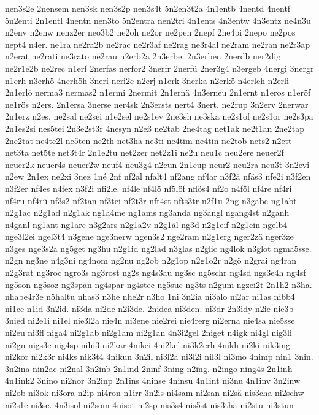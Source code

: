 {nen3s2e
2nensem
nen3sk
nen3s2p
nen3s4t
5n2en3t2a
4n1entb
4nentd
4nentf
5n2enti
2n1entl
4nentn
nen3to
5n2entra
nen2tri
4n1ents
4n3entw
4n3entz
ne4n3u
n2env
n2enw
nenz2er
neo3b2
ne2oh
ne2or
ne2pen
2nepf
2ne4pi
2nepo
ne2pos
nept4
n4er.
ne1ra
ne2ra2b
ne2rac
ne2r3af
ne2rag
ne3r4al
ne2ram
ne2ran
ne2r3ap
n2erat
ne2rati
ne3rato
ne2rau
n2erb2a
2n3erbe.
2n3erben
2nerdb
ner2dig
ne2r1e2b
ne2rec
n1erf
2nerfas
nerfor2
3nerfr
2nerfü
2ner3g4
n3ergeb
4nergi
3nergr
n1erh
n3erhö
4nerhöh
3neri
neri2e
n2erj
n1erk
3nerka
n2erkö
n4erleh
n2erli
2n1erlö
nerma3
nermas2
n1ermi
2nermit
2n1ernä
4n3erneu
2n1ernt
n1eros
n1eröf
ne1rös
n2ers.
2n1ersa
3nerse
ner4sk
2n3ersts
nert4
3nert.
ne2rup
3n2erv
2nerwar
2n1erz
n2es.
ne2sal
ne2sei
n1e2sel
ne2s1ev
2ne3sh
ne3ska
ne2s1of
ne2s1or
ne2s3pa
2n1es2si
nes5tei
2n3e2st3r
4nesyn
n2eß
ne2tab
2ne4tag
net1ak
ne2t1an
2ne2tap
2ne2tat
ne4te2l
ne5ten
ne2th
net3ha
ne3ti
ne4tim
ne4tin
ne2tob
nets2
n2ett
net3ta
net5te
net3t4r
2n1e2tu
net2zer
net2z1i
ne2u
neu1c
neu2ere
neuer2f
neuer2k
neuer4s
neuer2w
neuf4
neu3g4
n2eun
2n1eup
neur2
neu2ra
neu3t
3n2evi
n2ew
2n1ex
ne2xi
3nez
1né
2nf
nf2al
nfalt4
nf2ang
nf4ar
n3f2ä
nfäs3
nfe2i
n3f2en
n3f2er
nf4es
n4fex
n3f2i
nfi2le.
nf4le
nf4lö
nf5löf
nflös4
nf2o
n4föl
nf4re
nf4ri
nf4ru
nf4rü
nf3s2
nf2tan
nf3tei
nf2t3r
nft4st
nfts3tr
n2f1u
2ng
n3gabe
ng1abt
n2g1ac
n2g1ad
n2g1ak
ng1a4me
ng1ams
ng3anda
ng3angl
ngang4st
n2ganh
n4ganl
ng1ant
ng1are
n3g2ars
n2g1a2v
n2g1äl
ng3d
n2g1eif
n2g1ein
ngelb4
nge3l2ei
ngel3t4
n3gene
nge3nerw
ngen3s2
nge2ram
n2g1erg
nger2zä
nger3ze
n3ges
nge3s2a
ng5get
ng3hu
n2g1id
ng2lad
n3glas
n2glic
ng4lok
n3glot
ngma5sse.
n2gn
ng3ne
n4g3ni
ng4nom
ng2nu
ng2ob
n2g1op
n2g1o2r
n2gö
n2grai
ng4ran
n2g3rat
ng3roc
ngro3s
ng3rost
ng2s
ng4s3au
ng3sc
ng5schr
ng4sd
ngs3e4h
ng4sf
ng5son
ng5soz
ng3span
ng4spar
ng4stec
ng5suc
ng3ts
n2gum
ngzei2t
2n1h2
n3ha.
nhabe4r3e
n5haltu
nhas3
n3he
nhe2r
n3ho
1ni
3n2ia
ni3alo
ni2ar
ni1as
nibb4
ni1ce
n1id
3n2id.
ni3da
ni2de
n2i3de.
2nidea
ni3den.
ni3dr
2n3idy
n2ie
nie3b
3nied
ni2e1i
ni1el
nie3l2a
nie4n
ni3ene
nie2rei
nie4rerg
ni2erna
nie4sa
nie5sse
ni2eu
ni3fl
niga4
ni2g1ab
ni2g1am
ni2g1an
4n3i2gel
2niget
n4igk
ni4gl
nig3li
ni2gn
nigs3c
nig4sp
nihi3
ni2kar
4nikei
4ni2kel
ni3k2erh
4nikh
ni2ki
nik3ing
ni2kor
ni2k3r
ni4ks
nik3t4
4nikun
3n2il
ni3l2a
ni3l2i
nil3l
ni3mo
4nimp
nin1
3nin.
3n2ina
nin2ac
ni2nal
3n2inb
2n1ind
2ninf
3ning
n2ing.
n2ingo
ning4s
2n1inh
4n1ink2
3nino
ni2nor
3n2inp
2n1ins
4ninse
4ninsu
4n1int
ni3nu
4n1inv
3n2inw
ni2ob
ni3ok
ni3ora
n2ip
ni4ron
n1irr
3n2is
ni4sam
ni2san
ni2sä
nis3cha
ni2schw
ni2s1e
ni3se.
4n3isol
ni2som
4nisot
ni2sp
nis3s4
nis5st
nis3tha
ni2stu
ni3stun
}
